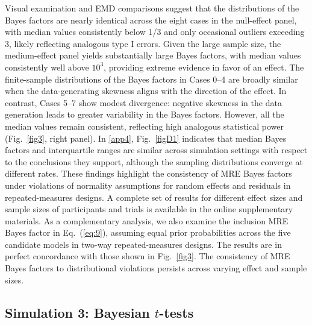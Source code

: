 \documentclass[preprint,12pt,authoryear]{elsarticle}
\begin{document}
Visual examination and EMD comparisons suggest that the distributions of the Bayes factors are nearly identical across the eight cases in the null-effect panel, with median values consistently below 1/3 and only occasional outliers exceeding 3, likely reflecting analogous type I errors. Given the large sample size, the medium-effect panel yields substantially large Bayes factors, with median values consistently well above $10^3$, providing extreme evidence in favor of an effect. The finite-sample distributions of the Bayes factors in Cases 0–4 are broadly similar when the data-generating skewness aligns with the direction of the effect. In contrast, Cases 5–7 show modest divergence: negative skewness in the data generation leads to greater variability in the Bayes factors. However, all the median values remain consistent, reflecting high analogous statistical power (Fig.~\ref{fig3}, right panel). In \ref{app4}, Fig.~\ref{figD1} indicates that median Bayes factors and interquartile ranges are similar across simulation settings with respect to the conclusions they support, although the sampling distributions converge at different rates. These findings highlight the consistency of MRE Bayes factors under violations of normality assumptions for random effects and residuals in repeated-measures designs. A complete set of results for different effect sizes and sample sizes of participants and trials is available in the online supplementary materials. As a complementary analysis, we also examine the inclusion MRE Bayes factor in Eq.~(\ref{eq:9}), assuming equal prior probabilities across the five candidate models in two-way repeated-measures designs. The results are in perfect concordance with those shown in Fig.~\ref{fig3}. The consistency of MRE Bayes factors to distributional violations persists across varying effect and sample sizes.


\subsection{Simulation 3: Bayesian $t$-tests}
\label{sec4.4}
\end{document}
